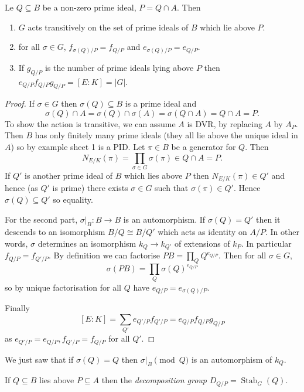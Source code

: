 \documentclass[a4paper]{article}
\begin{document}
\begin{proposition}
  Le \(Q \subseteq B\) be a non-zero prime ideal, \(P = Q \cap A\). Then
  \begin{enumerate}
  \item \(G\) acts transitively on the set of prime ideals of \(B\) which lie above \(P\).
  \item for all \(\sigma \in G\), \(f_{\sigma(Q)/P} = f_{Q/P}\) and \(e_{\sigma(Q)/P} = e_{Q/P}\).
  \item If \(g_{Q/P}\) is the number of prime ideals lying above \(P\) then \(e_{Q/P} f_{Q/P} g_{Q/P} = [E : K] = |G|\).
  \end{enumerate}
\end{proposition}

\begin{proof}
  If \(\sigma \in G\) then \(\sigma(Q) \subseteq B\) is a prime ideal and
  \[
    \sigma(Q) \cap A = \sigma(Q) \cap \sigma(A) = \sigma(Q \cap A) = Q \cap A = P.
  \]
  To show the action is transitive, we can assume \(A\) is DVR, by replacing \(A\) by \(A_P\). Then \(B\) has only finitely many prime ideals (they all lie above the unique ideal in \(A\)) so by example sheet 1 is a PID. Let \(\pi \in B\) be a generator for \(Q\). Then
  \[
    N_{E/K}(\pi) = \prod_{\sigma \in G} \sigma(\pi) \in Q \cap A = P.
  \]
  If \(Q'\) is another prime ideal of \(B\) which lies above \(P\) then \(N_{E/K}(\pi) \in Q'\) and hence (as \(Q'\) is prime) there exists \(\sigma \in G\) such that \(\sigma(\pi) \in Q'\). Hence \(\sigma(Q) \subseteq Q'\) so equality.

  For the second part, \(\sigma|_B: B \to B\) is an automorphism. If \(\sigma(Q) = Q'\) then it descends to an isomorphism \(B/Q \cong B/Q'\) which acts as identity on \(A/P\). In other words, \(\sigma\) determines an isomorphism \(k_Q \to k_{Q'}\) of extensions of \(k_P\). In particular \(f_{Q/P} = f_{Q'/P}\). By definition we can factorise \(PB = \prod_Q Q^{e_{Q/P}}\). Then for all \(\sigma \in G\),
  \[
    \sigma(PB) = \prod_Q \sigma(Q)^{e_{Q/P}}
  \]
  so by unique factorisation for all \(Q\) have \(e_{Q/P} = e_{\sigma(Q)/P}\).

  Finally
  \[
    [E: K] = \sum_{Q'} e_{Q'/P} f_{Q'/P} = e_{Q/P} f_{Q/P} g_{Q/P}
  \]
  as \(e_{Q'/P} = e_{Q/P}, f_{Q'/P} = f_{Q/P}\) for all \(Q'\).
\end{proof}

We just saw that if \(\sigma(Q) = Q\) then \(\sigma|_B \pmod Q\) is an automorphism of \(k_Q\).

\begin{definition}
  If \(Q \subseteq B\) lies above \(P \subseteq A\) then the \emph{decomposition group} \(D_{Q/P} = \operatorname{Stab}_G(Q)\).
\end{definition}
\end{document}
